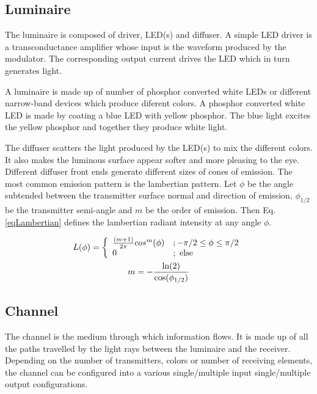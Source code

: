 \subsection{Luminaire}
\label{subsec:outlineLuminaire}
The luminaire is composed of driver, LED(s) and diffuser. A simple LED driver is a transconductance amplifier whose input is the waveform produced by the modulator. The corresponding output current drives the LED which in turn generates light. 

A luminaire is made up of number of phosphor converted white LEDs or different narrow-band devices which produce diferent colors. A phosphor converted white LED is made by coating a blue LED with yellow phosphor. The blue light excites the yellow phosphor and together they produce white light. 

The diffuser scatters the light produced by the LED(s) to mix the different colors. It also makes the luminous surface appear softer and more pleasing to the eye. Different diffuser front ends generate different sizes of cones of emission. The most common emission pattern is the lambertian pattern. Let $\phi$ be the angle subtended between the transmitter surface normal and direction of emission, $\phi_{1/2}$ be the transmitter semi-angle and $m$ be the order of emission. Then Eq.\ref{eqLambertian} defines the lambertian radiant intensity at any angle $\phi$.

\begin{subequations}
	\begin{gather}
	L(\phi) = \left\{ \begin{array}{ll} {\frac{(m+1)}{2\pi}}cos^{m}(\phi) &; -\pi/2\leq\phi\leq\pi/2 \\ 0 &; \mbox{ else} \end{array} \right. \label{eqLambertian} \\
	m = -\frac{\text{ln}(2)}{\text{cos}(\phi_{1/2})} \label{eqLambOrder}
	\end{gather}
\end{subequations}

\subsection{Channel}
\label{subsec:outlineChannel}
The channel is the medium through which information flows. It is made up of all the paths travelled by the light rays between the luminaire and the receiver. Depending on the number of transmitters, colors or number of receiving elements, the channel can be configured into a various single/multiple input single/multiple output configurations.


